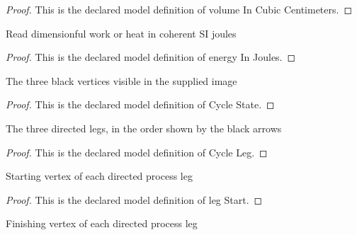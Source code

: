 \begin{proof}
  This is the declared model definition of volume In Cubic Centimeters.
\end{proof}
\begin{definition}
  \label{def:physics:phyx-mini-0422:phyxminiproblems-problemphyxmini0422-energyinjoules}
  Read dimensionful work or heat in coherent SI joules
\end{definition}
\begin{proof}
  This is the declared model definition of energy In Joules.
\end{proof}
\begin{definition}
  \label{def:physics:phyx-mini-0422:phyxminiproblems-problemphyxmini0422-cyclestate}
  The three black vertices visible in the supplied image
\end{definition}
\begin{proof}
  This is the declared model definition of Cycle State.
\end{proof}
\begin{definition}
  \label{def:physics:phyx-mini-0422:phyxminiproblems-problemphyxmini0422-cycleleg}
  The three directed legs, in the order shown by the black arrows
\end{definition}
\begin{proof}
  This is the declared model definition of Cycle Leg.
\end{proof}
\begin{definition}
  \label{def:physics:phyx-mini-0422:phyxminiproblems-problemphyxmini0422-legstart}
  Starting vertex of each directed process leg
\end{definition}
\begin{proof}
  This is the declared model definition of leg Start.
\end{proof}
\begin{definition}
  \label{def:physics:phyx-mini-0422:phyxminiproblems-problemphyxmini0422-legfinish}
  Finishing vertex of each directed process leg
\end{definition}
